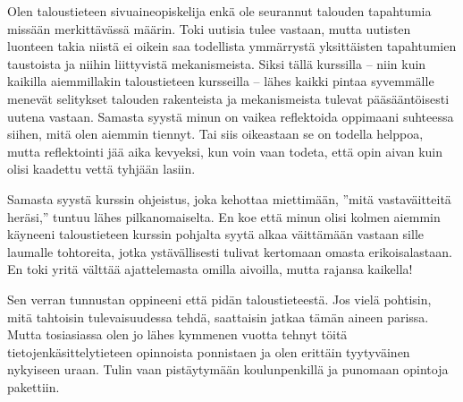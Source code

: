 \documentclass[12pt]{article}
\begin{document}
Olen taloustieteen sivuaineopiskelija enkä ole seurannut talouden tapahtumia
missään merkittävässä määrin. Toki uutisia tulee vastaan, mutta uutisten
luonteen takia niistä ei oikein saa todellista ymmärrystä yksittäisten
tapahtumien taustoista ja niihin liittyvistä mekanismeista. Siksi tällä
kurssilla -- niin kuin kaikilla aiemmillakin taloustieteen kursseilla --  lähes
kaikki pintaa syvemmälle menevät selitykset talouden rakenteista ja
mekanismeista tulevat pääsääntöisesti uutena vastaan. Samasta syystä minun on
vaikea reflektoida oppimaani suhteessa siihen, mitä olen aiemmin tiennyt. Tai
siis oikeastaan se on todella helppoa, mutta reflektointi jää aika kevyeksi,
kun voin vaan todeta, että opin aivan kuin olisi kaadettu vettä tyhjään lasiin.

Samasta syystä kurssin ohjeistus, joka kehottaa miettimään, ''mitä
vastaväitteitä heräsi,'' tuntuu lähes pilkanomaiselta. En koe että minun olisi
kolmen aiemmin käyneeni taloustieteen kurssin pohjalta syytä alkaa väittämään
vastaan sille laumalle tohtoreita, jotka ystävällisesti tulivat kertomaan
omasta erikoisalastaan. En toki yritä välttää ajattelemasta omilla aivoilla,
mutta rajansa kaikella!

Sen verran tunnustan oppineeni että pidän taloustieteestä. Jos vielä pohtisin,
mitä tahtoisin tulevaisuudessa tehdä, saattaisin jatkaa tämän aineen parissa.
Mutta tosiasiassa olen jo lähes kymmenen vuotta tehnyt töitä
tietojenkäsittelytieteen opinnoista ponnistaen ja olen erittäin tyytyväinen
nykyiseen uraan. Tulin vaan pistäytymään koulunpenkillä ja punomaan opintoja
pakettiin.
\end{document}
